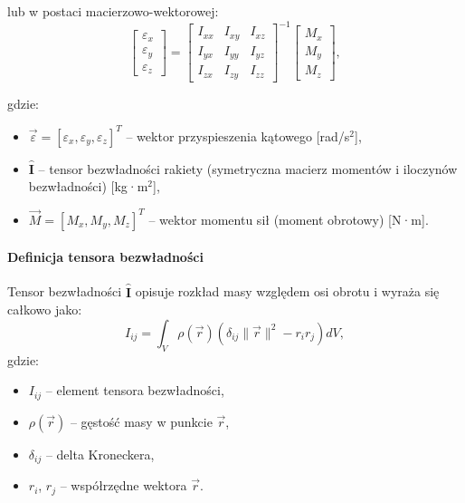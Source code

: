 lub w postaci macierzowo-wektorowej:
\begin{equation}
\begin{bmatrix}
\varepsilon_x \\
\varepsilon_y \\
\varepsilon_z
\end{bmatrix}
=
\begin{bmatrix}
I_{xx} & I_{xy} & I_{xz} \\
I_{yx} & I_{yy} & I_{yz} \\
I_{zx} & I_{zy} & I_{zz}
\end{bmatrix}^{-1}
\begin{bmatrix}
M_x \\
M_y \\
M_z
\end{bmatrix},
\label{eq:angular_acceleration_matrix}
\end{equation}

gdzie:
\begin{itemize}
\item $\vec{\varepsilon} = [\varepsilon_x, \varepsilon_y, \varepsilon_z]^T$ -- wektor przyspieszenia kątowego [rad/s$^2$],
\item $\mathbf{\hat{I}}$ -- tensor bezwładności rakiety (symetryczna macierz momentów i iloczynów bezwładności) [kg·m$^2$],
\item $\vec{M} = [M_x, M_y, M_z]^T$ -- wektor momentu sił (moment obrotowy) [N·m].
\end{itemize}

\paragraph{Definicja tensora bezwładności}

Tensor bezwładności $\mathbf{\hat{I}}$ opisuje rozkład masy względem osi obrotu i wyraża się całkowo jako:
\begin{equation}
I_{ij} = \int_V \rho(\vec{r}) \left( \delta_{ij} \|\vec{r}\|^2 - r_i r_j \right) dV,
\label{eq:inertia_tensor_integral}
\end{equation}
gdzie:
\begin{itemize}
\item $I_{ij}$ -- element tensora bezwładności,
\item $\rho(\vec{r})$ -- gęstość masy w punkcie $\vec{r}$,
\item $\delta_{ij}$ -- delta Kroneckera,
\item $r_i$, $r_j$ -- współrzędne wektora $\vec{r}$.
\end{itemize}

